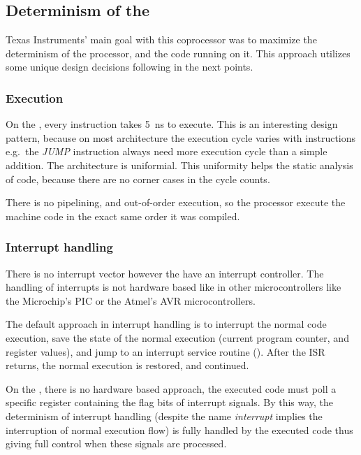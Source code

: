 \subsection{Determinism of the \pru}

Texas Instruments' main goal with this coprocessor was to maximize the determinism of the processor, and the code running on it. This approach utilizes some unique design decisions following in the next points.

\subsubsection{Execution}

On the \pru, every instruction takes \SI{5}{\nano\second} to execute. This is an interesting design pattern, because on most architecture the execution cycle varies with instructions e.g.\ the \emph{JUMP} instruction always need more execution cycle than a simple addition. The \pru{} architecture is uniformial. This uniformity helps the static analysis of code, because there are no corner cases in the cycle counts.

There is no pipelining, and out-of-order execution, so the processor execute the machine code in the exact same order it was compiled.

\subsubsection{Interrupt handling}

There is no interrupt vector however the \pruss{} have an interrupt controller. The handling of interrupts is not hardware based like in other microcontrollers like the Microchip's PIC or the Atmel's AVR microcontrollers.

The default approach in interrupt handling is to interrupt the normal code execution, save the state of the normal execution (current program counter, and register values), and jump to an interrupt service routine (). After the ISR returns, the normal execution is restored, and continued.

On the \pru{}, there is no hardware based approach, the executed code must poll a specific register containing the flag bits of interrupt signals. By this way, the determinism of interrupt handling (despite the name \emph{interrupt} implies the interruption of normal execution flow) is fully handled by the executed code thus giving full control when these signals are processed.

